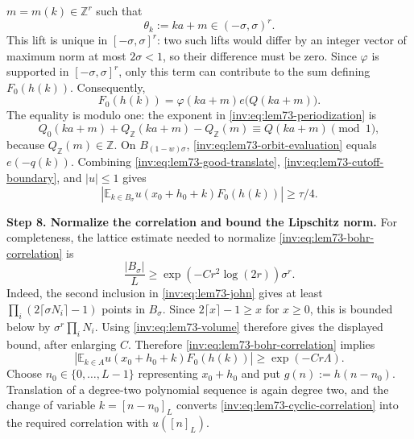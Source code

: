 \documentclass[twoside]{aomart}
\makeatletter
\theoremstyle{paperplain}
\theoremstyle{paperdefinition}
\renewenvironment{proof}[1][\proofname]{\par\pushQED{\qed}%
  \normalfont\topsep6\p@\@plus3\p@\relax\trivlist
  \item[\hskip\labelsep\itshape #1\@addpunct{.}]\ignorespaces
}{\popQED\endtrivlist\@endpefalse}
\numberwithin{equation}{section}
\makeatother
\begin{document}
\begin{proof}
$m=m(k)\in\mathbb Z^r$ such that
\[
\theta_k:=ka+m\in(-\sigma,\sigma)^r.
\]
This lift is unique in $[-\sigma,\sigma]^r$: two such lifts
would differ by an integer vector of maximum norm at most
$2\sigma<1$, so their difference must be zero.
Since $\varphi$ is supported in $[-\sigma,\sigma]^r$, only this
term can contribute to the sum defining $F_0(h(k))$. Consequently,
\begin{equation}
 F_0(h(k))=\varphi(ka+m)e\big(Q(ka+m)\big).                        \label{inv:eq:lem73-orbit-evaluation}
\end{equation}
The equality is modulo one: the exponent in \eqref{inv:eq:lem73-periodization} is
\[
 Q_0(ka+m)+Q_{\mathbb Z}(ka+m)-Q_{\mathbb Z}(m)
 \equiv Q(ka+m)\pmod1,
\]
because $Q_{\mathbb Z}(m)\in\mathbb Z$. On $B_{(1-w)\sigma}$, \eqref{inv:eq:lem73-orbit-evaluation} equals
$e(-q(k))$.  Combining \eqref{inv:eq:lem73-good-translate}, \eqref{inv:eq:lem73-cutoff-boundary}, and $|u|\le1$ gives
\begin{equation}
 \left|\mathbb E_{k\in B_\sigma}u(x_0+h_0+k)F_0(h(k))\right|\ge\tau/4. 
                                                                            \label{inv:eq:lem73-bohr-correlation}
\end{equation}

\par
\medskip
\noindent\textbf{Step 8. Normalize the correlation and bound the Lipschitz norm.}
For completeness, the lattice estimate needed to normalize \eqref{inv:eq:lem73-bohr-correlation} is
\begin{equation*}
 \frac{|B_\sigma|}{L}
 \ge \exp(-Cr^2\log(2r))\sigma^r.                                 
\end{equation*}
Indeed, the second inclusion in \eqref{inv:eq:lem73-john} gives at least
$\prod_i(2\lceil\sigma N_i\rceil-1)$ points in $B_\sigma$.  Since
$2\lceil x\rceil-1\ge x$ for $x\ge0$, this is bounded below by
$\sigma^r\prod_iN_i$.  Using \eqref{inv:eq:lem73-volume} therefore gives
the displayed bound, after enlarging $C$.
Therefore \eqref{inv:eq:lem73-bohr-correlation} implies
\begin{equation}
 \left|\mathbb E_{k\in A}u(x_0+h_0+k)F_0(h(k))\right|
 \ge \exp(-Cr\Lambda).                                            \label{inv:eq:lem73-cyclic-correlation}
\end{equation}
Choose $n_0\in\{0,\ldots,L-1\}$ representing $x_0+h_0$ and put
$g(n):=h(n-n_0)$.  Translation of a degree-two polynomial sequence is
again degree two, and the change of variable $k=[n-n_0]_L$ converts
\eqref{inv:eq:lem73-cyclic-correlation} into the required correlation with $u([n]_L)$.


\end{proof}
\end{document}
